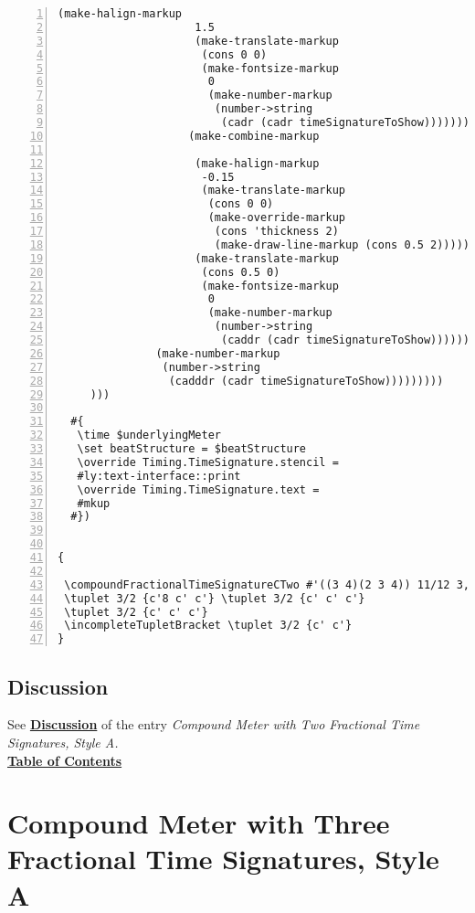 \begin{Verbatim}[numbers=left,xleftmargin=5mm]
                    (make-halign-markup
                     1.5
                     (make-translate-markup
                      (cons 0 0)
                      (make-fontsize-markup
                       0
                       (make-number-markup
                        (number->string
                         (cadr (cadr timeSignatureToShow)))))))
                    (make-combine-markup

                     (make-halign-markup
                      -0.15
                      (make-translate-markup
                       (cons 0 0)
                       (make-override-markup
                        (cons 'thickness 2)
                        (make-draw-line-markup (cons 0.5 2)))))
                     (make-translate-markup
                      (cons 0.5 0)
                      (make-fontsize-markup
                       0
                       (make-number-markup
                        (number->string
                         (caddr (cadr timeSignatureToShow))))))))))))
               (make-number-markup
                (number->string
                 (cadddr (cadr timeSignatureToShow)))))))))
     )))

  #{
   \time $underlyingMeter
   \set beatStructure = $beatStructure
   \override Timing.TimeSignature.stencil =
   #ly:text-interface::print
   \override Timing.TimeSignature.text =
   #mkup
  #})


{

 \compoundFractionalTimeSignatureCTwo #'((3 4)(2 3 4)) 11/12 3,3,3,2
 \tuplet 3/2 {c'8 c' c'} \tuplet 3/2 {c' c' c'}
 \tuplet 3/2 {c' c' c'}
 \incompleteTupletBracket \tuplet 3/2 {c' c'}
}
\end{Verbatim}
\subsection{Discussion}
See \hyperref[sec:compoundfractionalmeter_discussion]{\textbf{Discussion}} of the entry \textit{Compound Meter with Two Fractional Time Signatures, Style A.} \\

\hyperref[sec:toc]{\textbf{Table of Contents}}

\vfill \break





\section {Compound Meter with Three Fractional Time Signatures, Style A}

